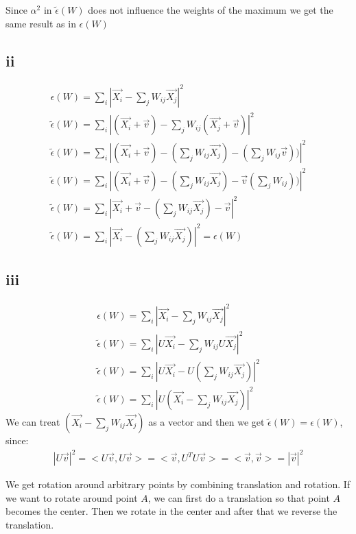 \documentclass[11pt,a4paper]{article}
\begin{document}
Since $\alpha^2$ in $\tilde{\epsilon}(W)$ does not influence the weights of the maximum we get the same result as in ${\epsilon}(W)$

\subsection*{ii}

\begin{gather*}
\epsilon(W) = \sum_{i} |\vec{X_{i}} - \sum_j W_{ij} \vec{X_{j}}| ^{2} \\
\tilde{\epsilon}(W) = \sum_{i} |(\vec{X_{i}} + \vec{v}) - \sum_j W_{ij}  (\vec{X_{j}} + \vec{v})| ^{2} \\
\tilde{\epsilon}(W) = \sum_{i} |(\vec{X_{i}} + \vec{v}) - (\sum_j W_{ij} \vec{X_{j}}) - (\sum_j W_{ij} \vec{v}))| ^{2} \\
\tilde{\epsilon}(W) = \sum_{i} |(\vec{X_{i}} + \vec{v}) - (\sum_j W_{ij} \vec{X_{j}}) - \vec{v} (\sum_j W_{ij}))| ^{2} \\
\tilde{\epsilon}(W) = \sum_{i} |\vec{X_{i}} + \vec{v} - (\sum_j W_{ij} \vec{X_{j}}) - \vec{v}| ^{2} \\
\tilde{\epsilon}(W) = \sum_{i} |\vec{X_{i}} - (\sum_j W_{ij} \vec{X_{j}})| ^{2} = \epsilon(W)
\end{gather*}

\subsection*{iii}

\begin{gather*}
\epsilon(W) = \sum_{i} |\vec{X_{i}} - \sum_j W_{ij} \vec{X_{j}}| ^{2} \\
\tilde{\epsilon}(W) = \sum_{i} |U\vec{X_{i}} - \sum_j W_{ij} U\vec{X_{j}}| ^{2} \\
\tilde{\epsilon}(W) = \sum_{i} |U\vec{X_{i}} - U(\sum_j W_{ij} \vec{X_{j}})| ^{2} \\
\tilde{\epsilon}(W) = \sum_{i} |U(\vec{X_{i}} - \sum_j W_{ij} \vec{X_{j}})| ^{2}
\end{gather*}
We can treat $(\vec{X_{i}} - \sum_j W_{ij} \vec{X_{j}})$ as a vector and then we get $\tilde{\epsilon}(W) = \epsilon(W)$, since:
\begin{gather*}
|U\vec{v}|^2 = <U\vec{v}, U\vec{v}> = <\vec{v}, U^T U\vec{v}> = <\vec{v}, \vec{v}> = |\vec{v}|^2
\end{gather*}

We get rotation around arbitrary points by combining translation and rotation. If we want to rotate around point $A$, we can first do a translation so that point $A$ becomes the center. Then we rotate in the center and after that we reverse the translation. 
\end{document}
